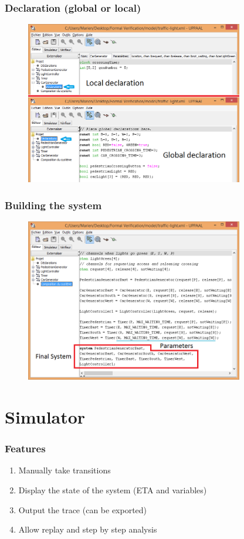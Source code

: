 \documentclass{beamer}
\begin{document}
\begin{frame}
	\frametitle{Declaration (global or local)}
	\begin{figure}
    	\centering
    	\includegraphics[width = 0.85\textwidth]{uppaal_main_window_declaration.png}
  	\end{figure}
\end{frame}

\begin{frame}
	\frametitle{Building the system}
	\begin{figure}
    	\centering
    	\includegraphics[width = 0.85\textwidth]{uppaal_main_window_system.png}
  	\end{figure}
\end{frame}

\section{Simulator}
\begin{frame}
	\frametitle{Features}
	\begin{block}{}
		\begin{enumerate}
			\item Manually take transitions
			\item Display the state of the system (ETA and variables)
			\item Output the trace (can be exported)
			\item Allow replay and step by step analysis
		\end{enumerate}
	\end{block}
\end{frame}
\end{document}
